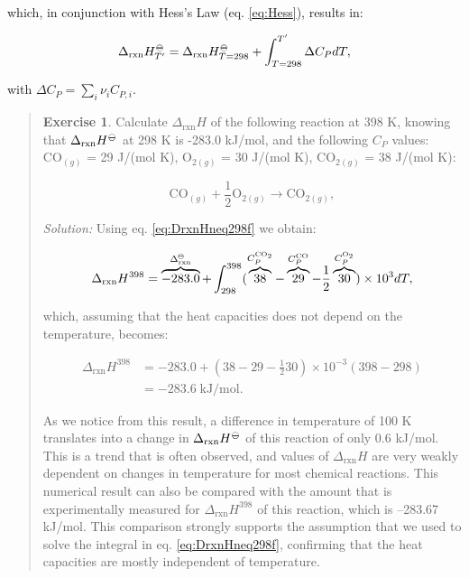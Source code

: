 \documentclass[
  9pt,
]{extbook}
\theoremstyle{definition}
\theoremstyle{definition}
\theoremstyle{definition}
\newtheorem{exercise}{Exercise}[chapter]
\theoremstyle{remark}
\begin{document}
which, in conjunction with Hess's Law (eq. \eqref{eq:Hess}), results in:

\begin{equation}
 \Delta_{\text{rxn}} H_{T'}^{-\kern-6pt{\ominus}\kern-6pt-}= \Delta_{\text{rxn}} H_{T=298}^{-\kern-6pt{\ominus}\kern-6pt-}+ \int_{T=298}^{T'} \Delta C_P dT,
  \label{eq:DrxnHneq298f}
\end{equation}

with \(\Delta C_P = \sum_i \nu_i C_{P,i}\).

\begin{quote}
\begin{exercise}
\protect\hypertarget{exr:DHtdiff298}{}{\label{exr:DHtdiff298} }Calculate \(\Delta_{\text{rxn}}H\) of the following reaction at 398 K, knowing that \(\Delta_{\text{rxn}}H^{-\kern-6pt{\ominus}\kern-6pt-}\) at 298 K is -283.0 kJ/mol, and the following \(C_P\) values: \(\mathrm{CO}_{(g)}\) = 29 J/(mol K), \(\mathrm{O}_{2(g)}\) = 30 J/(mol K), \(\mathrm{CO}_{2(g)}\) = 38 J/(mol K):

\[
\mathrm{CO}_{(g)}+\frac{1}{2}\mathrm{O}_{2(g)} \rightarrow \mathrm{CO}_{2(g)},
\]

\emph{Solution:} Using eq. \eqref{eq:DrxnHneq298f} we obtain:

\[
 \Delta_{\text{rxn}} H^{398} = \overbrace{-283.0}^{\Delta_{\text{rxn}}^{-\kern-6pt{\ominus}\kern-6pt-}} + \int_{298}^{398} ( \overbrace{38}^{C_P^{\mathrm{CO}_2}} -\overbrace{29}^{C_P^{\mathrm{CO}}} -\frac{1}{2}\overbrace{30}^{C_P^{\mathrm{O}_2}} ) \times 10^{3} dT,
\]

which, assuming that the heat capacities does not depend on the temperature, becomes:

\begin{equation}
\begin{aligned}
 \Delta_{\text{rxn}} H^{398} &= -283.0 + \left(38-29-\frac{1}{2}30 \right) \times 10^{-3} (398-298) \\ &= -283.6 \; \text{kJ/mol}.
\end{aligned}
\end{equation}

As we notice from this result, a difference in temperature of 100 K translates into a change in \(\Delta_{\text{rxn}}H^{-\kern-6pt{\ominus}\kern-6pt-}\) of this reaction of only 0.6 kJ/mol. This is a trend that is often observed, and values of \(\Delta_{\text{rxn}}H\) are very weakly dependent on changes in temperature for most chemical reactions. This numerical result can also be compared with the amount that is experimentally measured for \(\Delta_{\text{rxn}}H^{398}\) of this reaction, which is --283.67 kJ/mol. This comparison strongly supports the assumption that we used to solve the integral in eq. \eqref{eq:DrxnHneq298f}, confirming that the heat capacities are mostly independent of temperature.
\end{exercise}
\end{quote}
\end{document}
